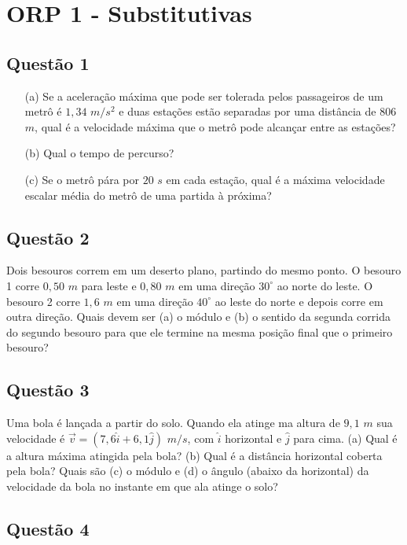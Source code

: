 \chapter{ORP 1 - Substitutivas} \label{ch:orp1subs}
\section*{Questão 1}
\textbf{\cite{Halliday2009}}
\begin{itemize}
    \item[(a)] Se a aceleração máxima que pode ser tolerada pelos passageiros de um metrô é $1,34$ $m/s^2$ e duas estações estão separadas por uma distância de $806$ $m$, qual é a velocidade máxima que o metrô pode alcançar entre as estações?
    \item[(b)] Qual o tempo de percurso?
    \item[(c)] Se o metrô pára por $20$ $s$ em cada estação, qual é a máxima velocidade escalar média do metrô de uma partida à próxima? 
\end{itemize}

\section*{Questão 2}

\textbf{\cite{Halliday2009}} Dois besouros correm em um deserto plano, partindo do mesmo ponto. O besouro 1 corre $0,50$ $m$ para leste e $0,80$ $m$ em uma direção $30^{\circ}$ ao norte do leste. O besouro 2 corre $1,6$ $m$ em uma direção $40^{\circ}$ ao leste do norte e depois corre em outra direção. Quais devem ser (a) o módulo e (b) o sentido da segunda corrida do segundo besouro para que ele termine na mesma posição final que o primeiro besouro?

\section*{Questão 3}

\textbf{\cite{Halliday2009}} Uma bola é lançada a partir do solo. Quando ela atinge ma altura de $9,1$ $m$ sua velocidade é $\vec{v} = (7,6 \hat{i} + 6,1 \hat{j})$ $m/s$, com $\hat{i}$ horizontal e $\hat{j}$ para cima. (a) Qual é a altura máxima atingida pela bola? (b) Qual é a distância horizontal coberta pela bola? Quais são (c) o módulo e (d) o ângulo (abaixo da horizontal) da velocidade da bola no instante em que ala atinge o solo? 

\section*{Questão 4}

